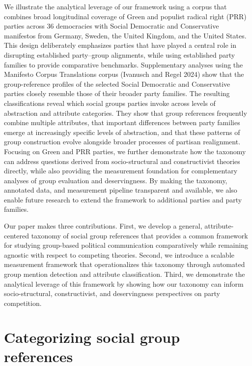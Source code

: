 \documentclass[12pt]{article}
\begin{document}
We illustrate the analytical leverage of our framework using a corpus that combines broad longitudinal coverage of Green and populist radical right (PRR) parties across 36 democracies with Social Democratic and Conservative manifestos from Germany, Sweden, the United Kingdom, and the United States.
This design deliberately emphasizes parties that have played a central role in disrupting established party--group alignments, while using established party families to provide comparative benchmarks.
Supplementary analyses using the Manifesto Corpus Translations corpus (Ivanusch and Regel 2024) show that the group-reference profiles of the selected Social Democratic and Conservative parties closely resemble those of their broader party families.
The resulting classifications reveal which social groups parties invoke across levels of abstraction and
attribute categories.
They show that group references frequently combine multiple attributes, that important differences between party families emerge at increasingly specific levels of abstraction, and that these patterns of group construction evolve alongside broader processes of partisan realignment.
Focusing on Green and PRR parties, we further demonstrate how the taxonomy can address questions derived from socio-structural and constructivist theories directly, while also providing the measurement foundation for complementary analyses of group evaluation and deservingness.
By making the taxonomy, annotated data, and measurement pipeline transparent and available, we also enable future research to extend the framework to additional parties and party families.

Our paper makes three contributions.
First, we develop a general, attribute-centered taxonomy of social group references that provides a common framework for studying group-based political communication comparatively while remaining agnostic with respect to competing theories.
Second, we introduce a scalable measurement framework that operationalizes this taxonomy through automated group mention detection and attribute classification.
Third, we demonstrate the analytical leverage of this framework by showing how our taxonomy can inform socio-structural, constructivist, and deservingness perspectives on party competition.

\section{Categorizing social group references}\label{categorizing-social-group-references}
\end{document}
